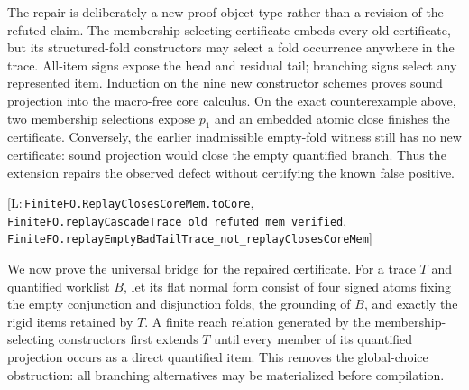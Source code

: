 \documentclass[11pt,a4paper]{article}
\newcommand{\lb}{\discretionary{}{}{}}
\theoremstyle{definition}
\newcommand{\lean}[1]{\texttt{#1}}
\newenvironment{leanrefs}
  {\par\smallskip\noindent\begin{minipage}{\linewidth}\small\raggedright}
  {\end{minipage}\par\smallskip}
\begin{document}
The repair is deliberately a new proof-object type rather than a revision
of the refuted claim.  The membership-selecting certificate embeds every
old certificate, but its structured-fold constructors may select a fold
occurrence anywhere in the trace.  All-item signs expose the head and
residual tail; branching signs select any represented item.  Induction on
the nine new constructor schemes proves sound projection into the
macro-free core calculus.  On the exact counterexample above, two
membership selections expose $p_1$ and an embedded atomic close finishes
the certificate.  Conversely, the earlier inadmissible empty-fold witness
still has no new certificate: sound projection would close the empty
quantified branch.  Thus the extension repairs the observed defect without
certifying the known false positive.
\begin{leanrefs}
[L:\,\lean{FiniteFO.ReplayClosesCoreMem.toCore},
\lean{FiniteFO.replayCascadeTrace\_\lb old\_\lb refuted\_\lb mem\_\lb verified},
\lean{FiniteFO.replayEmptyBadTailTrace\_\lb not\_\lb replayClosesCoreMem}]
\end{leanrefs}

We now prove the universal bridge for the repaired certificate.  For a
trace $T$ and quantified worklist $B$, let its flat normal form consist of
four signed atoms fixing the empty conjunction and disjunction folds, the
grounding of $B$, and exactly the rigid items retained by $T$.  A finite
reach relation generated by the membership-selecting constructors first
extends $T$ until every member of its quantified projection occurs as a
direct quantified item.  This removes the global-choice obstruction: all
branching alternatives may be materialized before compilation.
\end{document}
